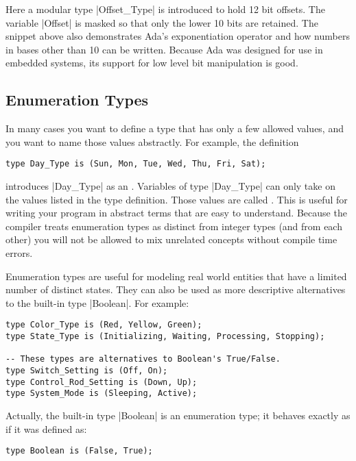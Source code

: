\noindent Here a modular type |Offset_Type| is introduced to hold 12 bit offsets. The variable
|Offset| is masked so that only the lower 10 bits are retained. The snippet above also
demonstrates Ada's exponentiation operator and how numbers in bases other than 10 can be
written. Because Ada was designed for use in embedded systems, its support for low level bit
manipulation is good.

\subsection{Enumeration Types}

In many cases you want to define a type that has only a few allowed values, and you want to name
those values abstractly. For example, the definition

\begin{lstlisting}
type Day_Type is (Sun, Mon, Tue, Wed, Thu, Fri, Sat);
\end{lstlisting}

\noindent introduces |Day_Type| as an . Variables of type |Day_Type|
can only take on the values listed in the type definition. Those values are called
. This is useful for writing your program in abstract terms that are easy
to understand. Because the compiler treats enumeration types as distinct from integer types (and
from each other) you will not be allowed to mix unrelated concepts without compile time errors.

Enumeration types are useful for modeling real world entities that have a limited number of
distinct states. They can also be used as more descriptive alternatives to the built-in type
|Boolean|. For example:

\begin{lstlisting}
type Color_Type is (Red, Yellow, Green);
type State_Type is (Initializing, Waiting, Processing, Stopping);

-- These types are alternatives to Boolean's True/False.
type Switch_Setting is (Off, On);
type Control_Rod_Setting is (Down, Up);
type System_Mode is (Sleeping, Active);
\end{lstlisting}

Actually, the built-in type |Boolean| is an enumeration type; it behaves exactly as if it was
defined as:

\begin{lstlisting}
type Boolean is (False, True);
\end{lstlisting}


